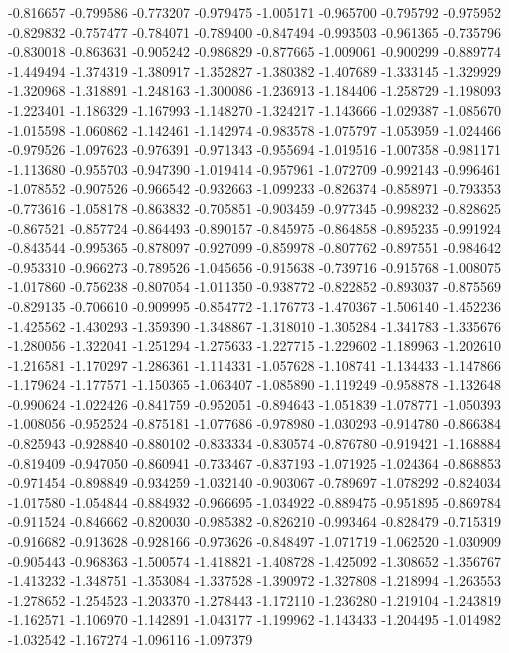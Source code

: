 -0.816657
-0.799586
-0.773207
-0.979475
-1.005171
-0.965700
-0.795792
-0.975952
-0.829832
-0.757477
-0.784071
-0.789400
-0.847494
-0.993503
-0.961365
-0.735796
-0.830018
-0.863631
-0.905242
-0.986829
-0.877665
-1.009061
-0.900299
-0.889774
-1.449494
-1.374319
-1.380917
-1.352827
-1.380382
-1.407689
-1.333145
-1.329929
-1.320968
-1.318891
-1.248163
-1.300086
-1.236913
-1.184406
-1.258729
-1.198093
-1.223401
-1.186329
-1.167993
-1.148270
-1.324217
-1.143666
-1.029387
-1.085670
-1.015598
-1.060862
-1.142461
-1.142974
-0.983578
-1.075797
-1.053959
-1.024466
-0.979526
-1.097623
-0.976391
-0.971343
-0.955694
-1.019516
-1.007358
-0.981171
-1.113680
-0.955703
-0.947390
-1.019414
-0.957961
-1.072709
-0.992143
-0.996461
-1.078552
-0.907526
-0.966542
-0.932663
-1.099233
-0.826374
-0.858971
-0.793353
-0.773616
-1.058178
-0.863832
-0.705851
-0.903459
-0.977345
-0.998232
-0.828625
-0.867521
-0.857724
-0.864493
-0.890157
-0.845975
-0.864858
-0.895235
-0.991924
-0.843544
-0.995365
-0.878097
-0.927099
-0.859978
-0.807762
-0.897551
-0.984642
-0.953310
-0.966273
-0.789526
-1.045656
-0.915638
-0.739716
-0.915768
-1.008075
-1.017860
-0.756238
-0.807054
-1.011350
-0.938772
-0.822852
-0.893037
-0.875569
-0.829135
-0.706610
-0.909995
-0.854772
-1.176773
-1.470367
-1.506140
-1.452236
-1.425562
-1.430293
-1.359390
-1.348867
-1.318010
-1.305284
-1.341783
-1.335676
-1.280056
-1.322041
-1.251294
-1.275633
-1.227715
-1.229602
-1.189963
-1.202610
-1.216581
-1.170297
-1.286361
-1.114331
-1.057628
-1.108741
-1.134433
-1.147866
-1.179624
-1.177571
-1.150365
-1.063407
-1.085890
-1.119249
-0.958878
-1.132648
-0.990624
-1.022426
-0.841759
-0.952051
-0.894643
-1.051839
-1.078771
-1.050393
-1.008056
-0.952524
-0.875181
-1.077686
-0.978980
-1.030293
-0.914780
-0.866384
-0.825943
-0.928840
-0.880102
-0.833334
-0.830574
-0.876780
-0.919421
-1.168884
-0.819409
-0.947050
-0.860941
-0.733467
-0.837193
-1.071925
-1.024364
-0.868853
-0.971454
-0.898849
-0.934259
-1.032140
-0.903067
-0.789697
-1.078292
-0.824034
-1.017580
-1.054844
-0.884932
-0.966695
-1.034922
-0.889475
-0.951895
-0.869784
-0.911524
-0.846662
-0.820030
-0.985382
-0.826210
-0.993464
-0.828479
-0.715319
-0.916682
-0.913628
-0.928166
-0.973626
-0.848497
-1.071719
-1.062520
-1.030909
-0.905443
-0.968363
-1.500574
-1.418821
-1.408728
-1.425092
-1.308652
-1.356767
-1.413232
-1.348751
-1.353084
-1.337528
-1.390972
-1.327808
-1.218994
-1.263553
-1.278652
-1.254523
-1.203370
-1.278443
-1.172110
-1.236280
-1.219104
-1.243819
-1.162571
-1.106970
-1.142891
-1.043177
-1.199962
-1.143433
-1.204495
-1.014982
-1.032542
-1.167274
-1.096116
-1.097379
